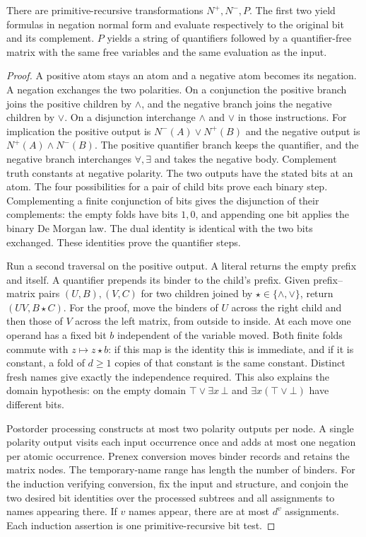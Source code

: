 \begin{theorem}
There are primitive-recursive transformations $N^+,N^-,P$. The first two yield formulas in negation normal form and evaluate respectively to the original bit and its complement. $P$ yields a string of quantifiers followed by a quantifier-free matrix with the same free variables and the same evaluation as the input.
\end{theorem}
\begin{proof}
A positive atom stays an atom and a negative atom becomes its negation. A negation exchanges the two polarities. On a conjunction the positive branch joins the positive children by $\wedge$, and the negative branch joins the negative children by $\vee$. On a disjunction interchange $\wedge$ and $\vee$ in those instructions. For implication the positive output is $N^-(A)\vee N^+(B)$ and the negative output is $N^+(A)\wedge N^-(B)$. The positive quantifier branch keeps the quantifier, and the negative branch interchanges $\forall,\exists$ and takes the negative body. Complement truth constants at negative polarity. The two outputs have the stated bits at an atom. The four possibilities for a pair of child bits prove each binary step. Complementing a finite conjunction of bits gives the disjunction of their complements: the empty folds have bits $1,0$, and appending one bit applies the binary De Morgan law. The dual identity is identical with the two bits exchanged. These identities prove the quantifier steps.

Run a second traversal on the positive output. A literal returns the empty prefix and itself. A quantifier prepends its binder to the child's prefix. Given prefix--matrix pairs $(U,B),(V,C)$ for two children joined by $\star\in\{\wedge,\vee\}$, return $(UV,B\star C)$. For the proof, move the binders of $U$ across the right child and then those of $V$ across the left matrix, from outside to inside. At each move one operand has a fixed bit $b$ independent of the variable moved. Both finite folds commute with $z\mapsto z\star b$: if this map is the identity this is immediate, and if it is constant, a fold of $d\ge1$ copies of that constant is the same constant. Distinct fresh names give exactly the independence required. This also explains the domain hypothesis: on the empty domain $\top\vee\exists x\,\bot$ and $\exists x(\top\vee\bot)$ have different bits.

Postorder processing constructs at most two polarity outputs per node. A single polarity output visits each input occurrence once and adds at most one negation per atomic occurrence. Prenex conversion moves binder records and retains the matrix nodes. The temporary-name range has length the number of binders. For the induction verifying conversion, fix the input and structure, and conjoin the two desired bit identities over the processed subtrees and all assignments to names appearing there. If $v$ names appear, there are at most $d^v$ assignments. Each induction assertion is one primitive-recursive bit test.
\end{proof}

